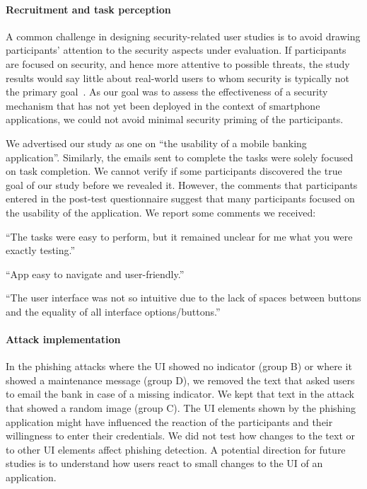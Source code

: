 \paragraph{Recruitment and task perception}
A common challenge in designing security-related user studies is to avoid drawing participants' attention to the security aspects under evaluation.
If participants are focused on security, and hence more attentive to possible threats, the study results would say little about real-world users to whom security is typically not the primary goal~\cite{chisecurity,schechter07sp}. 
As our goal was to assess the effectiveness of a security mechanism that has not yet been deployed in the context of smartphone applications, we could not avoid minimal security priming of the participants.

We advertised our study as one on ``the usability of a mobile banking application''.
Similarly, the emails sent to complete the tasks were solely focused on task completion.
We cannot verify if some participants discovered the true goal of our study before we revealed it. However, the comments that participants entered in the post-test questionnaire suggest that many participants focused on the usability of the application. We report some comments we received:

\begin{myquote}
  ``The tasks were easy to perform, but it remained unclear for me what you were exactly testing.''
\end{myquote}
\begin{myquote}
	``App easy to navigate and user-friendly.''
\end{myquote}
\begin{myquote}
	``The user interface was not so intuitive due to the lack of spaces between buttons and the equality of all interface options/buttons.''	
\end{myquote}

\paragraph{Attack implementation}
In the phishing attacks where the UI showed no indicator (group B) or where it showed a maintenance message (group D), we removed the text that asked users to email the bank in case of a missing indicator. We kept that text in the attack that showed a random image (group C).
The UI elements shown by the phishing application might have influenced the reaction of the participants and their willingness to enter their credentials.
We did not test how changes to the text or to other UI elements affect phishing detection. A potential direction for future studies is to understand how users react to small changes to the UI of an application.

